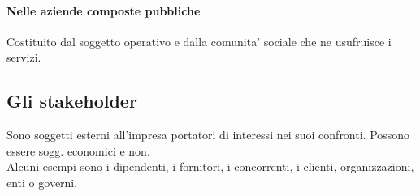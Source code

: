 \documentclass{report}
\begin{document}
	\paragraph{Nelle aziende composte pubbliche}Costituito dal soggetto operativo e dalla comunita' sociale che ne usufruisce i servizi.
	\subsection{Gli stakeholder}
	Sono soggetti esterni all'impresa portatori di interessi nei suoi confronti. Possono essere sogg. economici e non.\medskip \\Alcuni esempi sono i dipendenti, i fornitori, i concorrenti, i clienti, organizzazioni, enti o governi.
	
\end{document}
